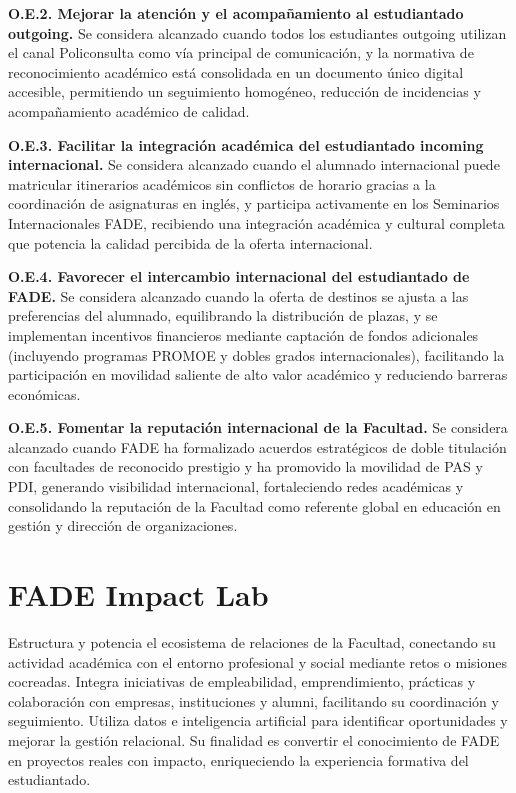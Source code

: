 \documentclass[11pt,a4paper]{scrreprt}
\begin{document}
\textbf{O.E.2. Mejorar la atención y el acompañamiento al estudiantado outgoing.} Se considera alcanzado cuando todos los estudiantes outgoing utilizan el canal Policonsulta como vía principal de comunicación, y la normativa de reconocimiento académico está consolidada en un documento único digital accesible, permitiendo un seguimiento homogéneo, reducción de incidencias y acompañamiento académico de calidad.

\textbf{O.E.3. Facilitar la integración académica del estudiantado incoming internacional.} Se considera alcanzado cuando el alumnado internacional puede matricular itinerarios académicos sin conflictos de horario gracias a la coordinación de asignaturas en inglés, y participa activamente en los Seminarios Internacionales FADE, recibiendo una integración académica y cultural completa que potencia la calidad percibida de la oferta internacional.

\textbf{O.E.4. Favorecer el intercambio internacional del estudiantado de FADE.} Se considera alcanzado cuando la oferta de destinos se ajusta a las preferencias del alumnado, equilibrando la distribución de plazas, y se implementan incentivos financieros mediante captación de fondos adicionales (incluyendo programas PROMOE y dobles grados internacionales), facilitando la participación en movilidad saliente de alto valor académico y reduciendo barreras económicas.

\textbf{O.E.5. Fomentar la reputación internacional de la Facultad.} Se considera alcanzado cuando FADE ha formalizado acuerdos estratégicos de doble titulación con facultades de reconocido prestigio y ha promovido la movilidad de PAS y PDI, generando visibilidad internacional, fortaleciendo redes académicas y consolidando la reputación de la Facultad como referente global en educación en gestión y dirección de organizaciones.
\clearpage

\chapter[FADE Impact Lab]{\textcolor{filcolor}{FADE Impact Lab}}
\begin{tcolorbox}[descbox]
\small Estructura y potencia el ecosistema de relaciones de la Facultad, conectando su actividad académica con el entorno profesional y social mediante retos o misiones cocreadas. Integra iniciativas de empleabilidad, emprendimiento, prácticas y colaboración con empresas, instituciones y alumni, facilitando su coordinación y seguimiento. Utiliza datos e inteligencia artificial para identificar oportunidades y mejorar la gestión relacional. Su finalidad es convertir el conocimiento de FADE en proyectos reales con impacto, enriqueciendo la experiencia formativa del estudiantado.
\end{tcolorbox}
\end{document}
